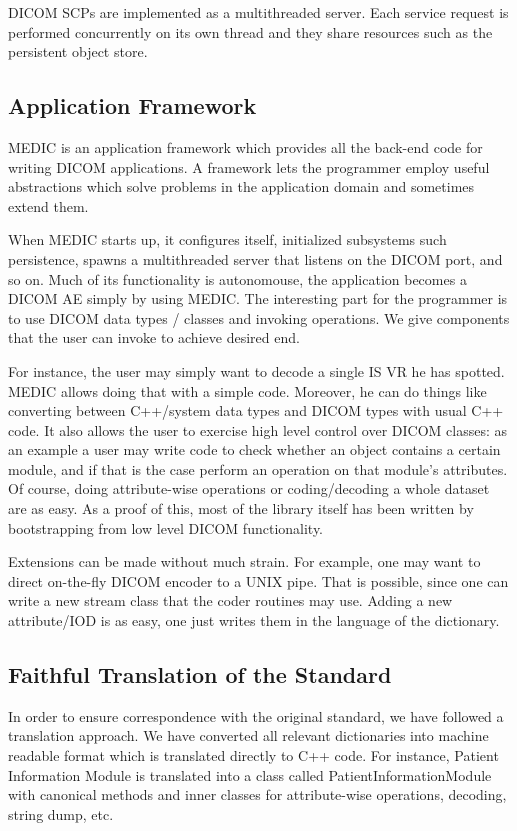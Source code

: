 \documentclass[a4paper,10pt]{article}
\begin{document}
DICOM SCPs are implemented as a multithreaded server. Each service
request is performed concurrently on its own thread and they share
resources such as the persistent object store.

\subsection{Application Framework}

MEDIC is an application framework which provides all the back-end
code for writing DICOM applications. A framework lets the programmer
employ useful abstractions which solve problems in the application
domain and sometimes extend them.

When MEDIC starts up, it configures itself, initialized subsystems
such persistence, spawns a multithreaded server that listens on
the DICOM port, and so on. Much of its functionality is autonomouse,
the application becomes a DICOM AE simply by using MEDIC. The
interesting part for the programmer is to use DICOM data types /
classes and invoking operations. We give components that the user
can invoke to achieve desired end. 

For instance, the user may simply want to decode a single IS VR
he has spotted. MEDIC allows doing that with a simple code. Moreover,
he can do things like converting between C++/system data types and
DICOM types with usual C++ code. It also allows the user to exercise
high level control over DICOM classes: as an example a user may write
code to check whether an object contains a certain module, and if that
is the case perform an operation on that module's attributes. Of
course, doing attribute-wise operations or coding/decoding a whole
dataset are as easy. As a proof of this, most of the library itself
has been written by bootstrapping from low level DICOM functionality.

Extensions can be made without much strain. For example, one may want
to direct on-the-fly DICOM encoder to a UNIX pipe. That is possible,
since one can write a new stream class that the coder routines may
use. Adding a new attribute/IOD is as easy, one just writes them in
the language of the dictionary.

\subsection{Faithful Translation of the Standard}

In order to ensure correspondence with the original standard, we have
followed a translation approach. We have converted all relevant
dictionaries into machine readable format which is translated directly
to C++ code. For instance, Patient Information Module is translated
into a class called PatientInformationModule with canonical methods
and inner classes for attribute-wise operations, decoding, string dump,
etc. 
\end{document}
